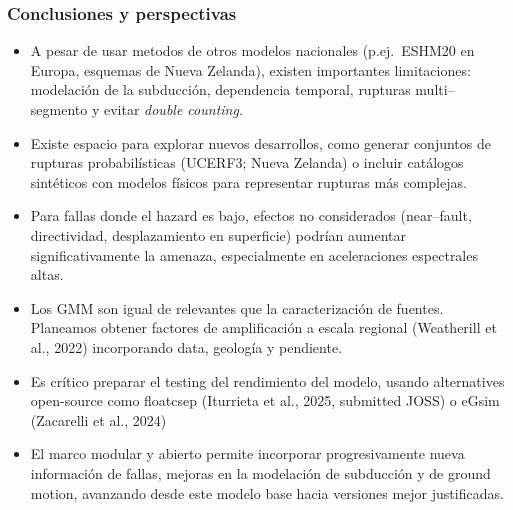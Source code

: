 \documentclass[9pt,ignorenonframetext,mathserif,aspectratio=169,xcolor=dvipsnames]{beamer}
\begin{document}
\begin{frame}[t]\frametitle{Conclusiones y perspectivas}

\begin{itemize}
  \item A pesar de usar metodos de otros modelos nacionales
        (p.ej.\ ESHM20 en Europa, esquemas de Nueva Zelanda), existen
        importantes limitaciones: modelación de la subducción, dependencia
        temporal, rupturas multi–segmento y evitar \emph{double counting}.

  \item Existe espacio para explorar nuevos desarrollos, como generar conjuntos de rupturas probabilísticas (UCERF3; Nueva Zelanda) o incluir catálogos sintéticos con modelos físicos para representar rupturas más complejas.

  \item Para fallas donde el hazard es bajo, efectos no
        considerados (near–fault, directividad, desplazamiento
        en superficie) podrían aumentar significativamente la amenaza,
        especialmente en aceleraciones espectrales altas.

  \item Los GMM son igual de relevantes que la
        caracterización de fuentes. Planeamos obtener factores de amplificación a escala regional (Weatherill et al., 2022) incorporando data, geología y pendiente.
\item Es crítico preparar el testing del rendimiento del modelo, usando alternatives open-source como floatcsep (Iturrieta et al., 2025, submitted JOSS) o eGsim (Zacarelli et al., 2024)

  \item El marco modular y abierto permite incorporar progresivamente
        nueva información de fallas, mejoras en la modelación de
        subducción y de ground motion, avanzando desde este modelo base
        hacia versiones mejor justificadas.

\end{itemize}

\end{frame}
\end{document}
